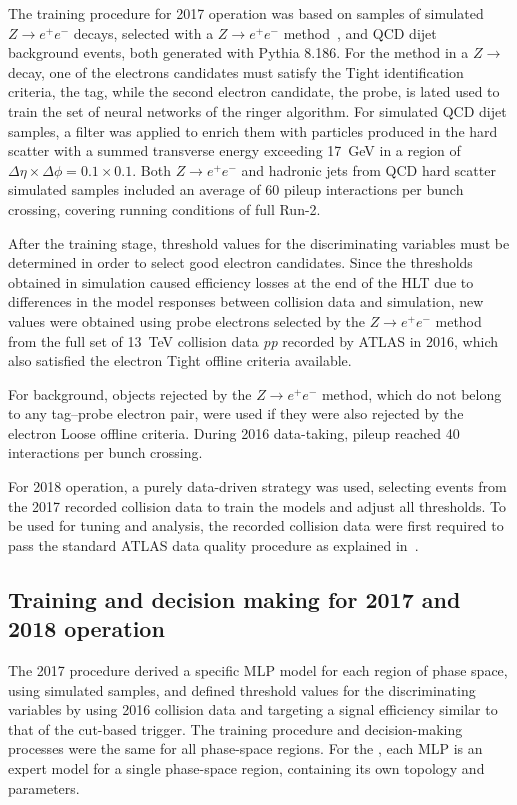 The training procedure for 2017 operation was based on samples of simulated $Z\rightarrow e^+e^-$ decays, selected with a $Z\rightarrow e^+e^-$ \tnp method~\cite{TRIG-2018-05}, and 
QCD dijet background events, both generated with Pythia 8.186. 
For the \tnp method in a $Z\rightarrow$ decay, one of the electrons candidates must satisfy the Tight identification criteria, the tag, while the second electron candidate, the probe, is lated used to train the set of neural networks of the ringer algorithm. 
For simulated QCD dijet samples, a filter was applied to enrich them with particles produced in the hard scatter with a summed transverse energy exceeding 17~GeV in a region of $\Delta\eta\times\Delta\phi=0.1\times0.1$.
Both $Z\rightarrow e^+e^-$ and hadronic jets from QCD hard scatter simulated samples included an average of 60 pileup interactions per bunch crossing,
covering running conditions of full Run-2.

After the training stage, threshold values for the discriminating variables must be determined in order to select good electron candidates. Since the thresholds obtained in simulation caused efficiency losses at the end of the HLT due to differences in the model responses between collision data and simulation, new values were obtained using probe electrons selected by the $Z\rightarrow e^+e^-$ \tnp method from the full set of 13~TeV collision data \textit{pp} recorded by ATLAS in 2016, which also satisfied the electron Tight offline criteria available.


For background, objects rejected by the $Z\rightarrow e^+e^-$ \tnp method, which do not belong to any tag--probe electron pair, were used if they were also rejected by the electron Loose offline criteria. During 2016 data-taking, pileup reached 40 interactions per bunch crossing.

For 2018 operation, a purely data-driven strategy was used, selecting events from the 2017 recorded collision data to train the models and adjust all thresholds. To be used for tuning and analysis, the recorded collision data were first required to pass the standard ATLAS data quality procedure as explained in~\cite{DAPR-2018-01}. 


\subsection{Training and decision making for 2017 and 2018 operation}\label{sec:tuning}


The 2017 procedure derived a specific MLP model for each region of \eteta phase space, using simulated samples, and defined threshold values for the discriminating variables by using 2016 collision data and targeting a signal efficiency similar to that of the cut-based trigger. The training procedure and decision-making processes were the same for all phase-space regions. For the \rnn{}, each MLP is an expert model for a single phase-space region, containing its own topology and parameters.

